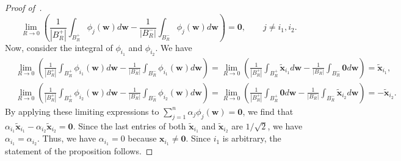 \begin{proof}[Proof of~]
\begin{equation*}
    \lim_{R\rightarrow 0}\left(\frac{1}{|B_R^+|}\int_{B_R^+} \phi_j(\mathbf{w}) d\mathbf{w} - \frac{1}{|B_R^-|}\int_{B_R^-} \phi_j(\mathbf{w}) d\mathbf{w}\right) = \mathbf{0}, \qquad j\neq i_1, i_2.
\end{equation*}
Now, consider the integral of $\phi_{i_1}$ and $\phi_{i_2}$. We have
\begin{align*}
    &\!\!\lim_{R\rightarrow 0}\!\!\left(\frac{1}{|B_R^+|}\!\!\int_{B_R^+}\!\! \phi_{i_1}(\mathbf{w}) d\mathbf{w}\!-\! \frac{1}{|B_R^-|}\!\!\int_{B_R^-}\!\! \phi_{i_1}(\mathbf{w}) d\mathbf{w}\!\!\right) \!\!=\! \lim_{R\rightarrow 0}\!\!\left(\frac{1}{|B_R^+|}\!\!\int_{B_R^+}\!\! \tilde{\mathbf{x}}_{i_1} d\mathbf{w} \!-\! \frac{1}{|B_R^-|}\int_{B_R^-} \!\!\! \mathbf{0} d\mathbf{w}\!\!\right)\!\! = \tilde{\mathbf{x}}_{i_1}, \\
    &\!\!\lim_{R\rightarrow 0}\!\!\left(\frac{1}{|B_R^+|}\!\!\int_{B_R^+}\!\! \phi_{i_2}(\mathbf{w}) d\mathbf{w} \!-\! \frac{1}{|B_R^-|}\!\!\int_{B_R^-} \!\!\phi_{i_2}(\mathbf{w}) d\mathbf{w}\!\!\right)\!\! =\! \lim_{R\rightarrow 0}\!\!\left(\frac{1}{|B_R^+|}\!\!\int_{B_R^+} \!\!\!\mathbf{0} d\mathbf{w} \!-\! \frac{1}{|B_R^-|}\!\!\int_{B_R^-}\!\! \tilde{\mathbf{x}}_{i_2} d\mathbf{w}\!\!\right)\!\! = -\tilde{\mathbf{x}}_{i_2}.
\end{align*}
By applying these limiting expressions to $\sum_{j=1}^n \alpha_j\phi_{j}(\mathbf{w}) = \mathbf{0}$, we find that $\alpha_{i_1} \tilde{\mathbf{x}}_{i_1} - \alpha_{i_2} \tilde{\mathbf{x}}_{i_2} = \mathbf{0}$. 
Since the last entries of both $\tilde{\mathbf{x}}_{i_1}$ and $\tilde{\mathbf{x}}_{i_2}$ are $1/\sqrt{2}$, we have $\alpha_{i_1} =\alpha_{i_2}$. 
Thus, we have $\alpha_{i_1} = 0$ because $\mathbf{x}_{i_1} \neq \mathbf{0}$. Since $i_1$ is arbitrary, the statement of the proposition follows.  
\end{proof}

